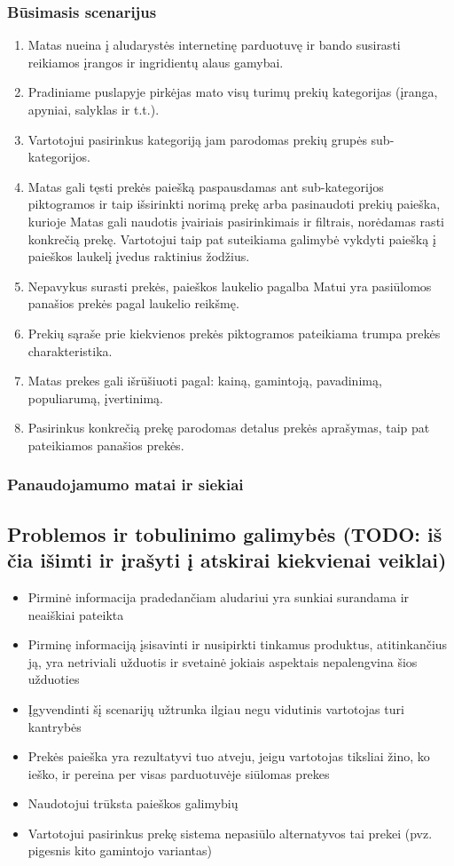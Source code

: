 \documentclass[oneside]{VUMIFPSkursinis}
\begin{document}
		\subsubsection{Būsimasis scenarijus}
			\begin{enumerate}
				\item{Matas nueina į aludarystės internetinę parduotuvę ir bando susirasti reikiamos įrangos ir ingridientų alaus gamybai.}
				\item{Pradiniame puslapyje pirkėjas mato visų turimų prekių kategorijas (įranga, apyniai, salyklas ir t.t.).}
				\item{Vartotojui pasirinkus kategoriją jam parodomas prekių grupės sub-kategorijos.}
				\item{Matas gali tęsti prekės paiešką paspausdamas ant sub-kategorijos piktogramos ir taip išsirinkti norimą prekę arba pasinaudoti prekių paieška, kurioje Matas gali naudotis įvairiais  pasirinkimais ir filtrais, norėdamas rasti konkrečią prekę. Vartotojui taip pat suteikiama galimybė vykdyti paiešką į paieškos laukelį įvedus raktinius žodžius.}
				\item{Nepavykus surasti prekės, paieškos laukelio pagalba Matui yra pasiūlomos panašios prekės pagal laukelio reikšmę.}
				\item{Prekių sąraše prie kiekvienos prekės piktogramos pateikiama trumpa prekės charakteristika. }
				\item{Matas prekes gali išrūšiuoti pagal: kainą, gamintoją, pavadinimą, populiarumą, įvertinimą.}
				\item{Pasirinkus konkrečią prekę parodomas detalus prekės aprašymas, taip pat pateikiamos panašios prekės.}
			\end{enumerate}
		\subsubsection{Panaudojamumo matai ir siekiai}
	\subsection{Problemos ir tobulinimo galimybės (TODO: iš čia išimti ir įrašyti į atskirai kiekvienai veiklai)}
		\begin{itemize}
			\item{Pirminė informacija pradedančiam aludariui yra sunkiai surandama ir neaiškiai pateikta}
			\item{Pirminę informaciją įsisavinti ir nusipirkti tinkamus produktus, atitinkančius ją, yra netriviali užduotis ir svetainė jokiais aspektais nepalengvina šios užduoties}
			\item{Įgyvendinti šį scenarijų užtrunka ilgiau negu vidutinis vartotojas turi kantrybės}
			\item{Prekės paieška yra rezultatyvi tuo atveju, jeigu vartotojas tiksliai žino, ko ieško, ir pereina per visas parduotuvėje siūlomas prekes}
			\item{Naudotojui trūksta paieškos galimybių}
			\item{Vartotojui pasirinkus prekę sistema nepasiūlo alternatyvos tai prekei (pvz. pigesnis kito gamintojo variantas)}
		\end{itemize}
\end{document}
